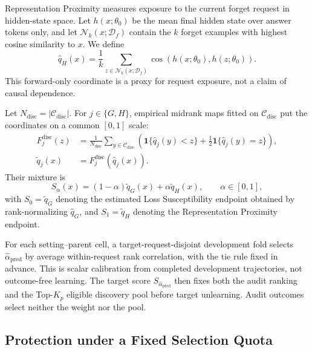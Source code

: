 Representation Proximity measures exposure to the current forget request in
hidden-state space. Let $h(x;\theta_0)$ be the mean final hidden state over
answer tokens only, and let $\mathcal N_k(x;\mathcal D_f)$ contain the $k$
forget examples with highest cosine similarity to $x$. We define
\begin{equation}
  \widehat q_H(x)
  =
  \frac{1}{k}\sum_{z\in\mathcal N_k(x;\mathcal D_f)}
  \operatorname{cos}\!\left(h(x;\theta_0),h(z;\theta_0)\right).
  \label{eq:representation-proximity}
\end{equation}
This forward-only coordinate is a proxy for request exposure, not a claim of
causal dependence.

Let $N_{\mathrm{disc}}=|\mathcal C_{\mathrm{disc}}|$. For
$j\in\{G,H\}$, empirical midrank maps fitted
on $\mathcal C_{\mathrm{disc}}$ put the coordinates on a common $[0,1]$ scale:
\begin{equation}
\begin{aligned}
F_j^{\mathrm{disc}}(z)
&=\frac{1}{N_{\mathrm{disc}}}\sum_{y\in\mathcal C_{\mathrm{disc}}}
\left(\mathbf 1\{\widehat q_j(y)<z\}+\tfrac12\mathbf 1\{\widehat q_j(y)=z\}\right),\\
\widetilde q_j(x)&=F_j^{\mathrm{disc}}(\widehat q_j(x)).
\end{aligned}
\label{eq:midrank-normalization}
\end{equation}
Their mixture is
\begin{equation}
  S_\alpha(x)
  =(1-\alpha)\widetilde q_G(x)+\alpha\widetilde q_H(x),
  \qquad \alpha\in[0,1],
  \label{eq:mixture}
\end{equation}
with $S_0=\widetilde q_G$ denoting the estimated Loss Susceptibility endpoint
obtained by rank-normalizing $\widehat q_G$, and $S_1=\widetilde q_H$ denoting the
Representation Proximity endpoint.

For each setting--parent cell, a target-request-disjoint development fold
selects $\widehat\alpha_{\mathrm{pred}}$ by average within-request rank
correlation, with the tie rule fixed in advance. This is scalar calibration
from completed development trajectories, not outcome-free learning. The
target score $S_{\widehat\alpha_{\mathrm{pred}}}$ then fixes both the audit
ranking and the Top-$K_p$ eligible discovery pool before target unlearning.
Audit outcomes select neither the weight nor the pool.

\subsection{Protection under a Fixed Selection Quota}
\label{sec:method-protection}

